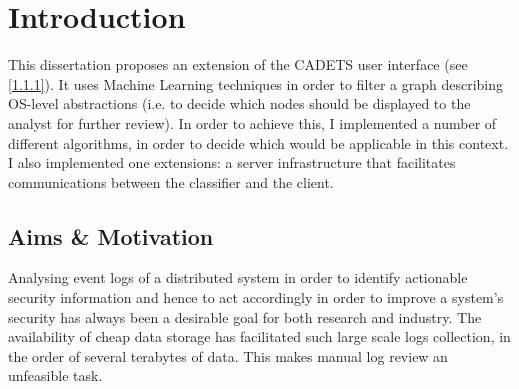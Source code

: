 
	
	\chapter{Introduction}
	
	This dissertation proposes an extension of the CADETS user interface (see \ref{1.1.1}). It uses Machine Learning techniques in order to filter a graph describing OS-level abstractions (i.e. to decide which nodes should be displayed to the analyst for further review). In order to achieve this, I implemented a number of different algorithms, in order to decide which would be applicable in this context. I also implemented one extensions: a server infrastructure that facilitates communications between the classifier and the client.
	
	\section{Aims \& Motivation}  \label{1.1}
	Analysing event logs of a distributed system in order to identify actionable security information and hence to act accordingly in order to improve a system's security has always been a desirable goal for both research and industry. The availability of cheap data storage has facilitated such large scale logs collection, in the order of several terabytes of data. This makes manual log review an unfeasible task. 
	
